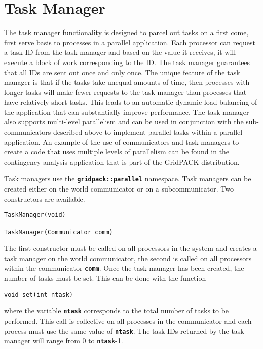 \section{Task Manager}

The task manager functionality is designed to parcel out tasks on a first come, first serve basis to processes in a parallel application. Each processor can request a task ID from the task manager and based on the value it receives, it will execute a block of work corresponding to the ID. The task manager guarantees that all IDs are sent out once and only once. The unique feature of the task manager is that if the tasks take unequal amounts of time, then processes with longer tasks will make fewer requests to the task manager than processes that have relatively short tasks. This leads to an automatic dynamic load balancing of the application that can substantially improve performance. The task manager also supports multi-level parallelism and can be used in conjunction with the sub-communicators described above to implement parallel tasks within a parallel application. An example of the use of communicators and task managers to create a code that uses multiple levels of parallelism can be found in the contingency analysis application that is part of the GridPACK distribution.

Task managers use the \texttt{\textbf{gridpack::parallel}} namespace. Task managers can be created either on the world communicator or on a subcommunicator. Two constructors are available.

{
\color{red}
\begin{Verbatim}[fontseries=b]
TaskManager(void)

TaskManager(Communicator comm)
\end{Verbatim}
}

The first constructor must be called on all processors in the system and creates a task manager on the world communicator, the second is called on all processors within the communicator \texttt{\textbf{comm}}. Once the task manager has been created, the number of tasks must be set. This can be done with the function

{
\color{red}
\begin{Verbatim}[fontseries=b]
void set(int ntask)
\end{Verbatim}
}

where the variable \texttt{\textbf{ntask}} corresponds to the total number of tasks to be performed. This call is collective on all processes in the communicator and each process must use the same value of \texttt{\textbf{ntask}}. The task IDs returned by the task manager will range from 0 to \texttt{\textbf{ntask}}-1.

